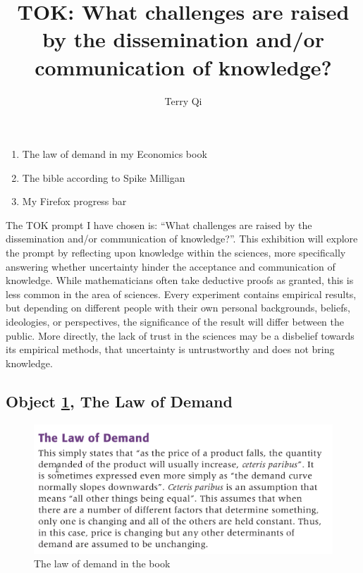 \documentclass[a4paper,12pt]{article}
\title{TOK: What challenges are raised by the dissemination and/or communication of knowledge?}
\author{Terry Qi}
\begin{document}
\maketitle
\begin{enumerate}
 \item The law of demand in my Economics book
 \item The bible according to Spike Milligan
 \item My Firefox progress bar
\end{enumerate}

\newpage



The TOK prompt I have chosen is: ``What challenges are raised by the dissemination and/or communication of knowledge?''. This exhibition will explore the prompt by reflecting upon knowledge within the sciences, more specifically answering whether uncertainty hinder the acceptance and communication of knowledge. While mathematicians often take deductive proofs as granted, this is less common in the area of sciences. Every experiment contains empirical results, but depending on different people with their own personal backgrounds, beliefs, ideologies, or perspectives, the significance of the result will differ between the public. More directly, the lack of trust in the sciences may be a disbelief towards its empirical methods, that uncertainty is untrustworthy and does not bring knowledge.


\subsection*{Object \ref{fig:lod}, The Law of Demand}

\begin{figure}[h!]
 \centering
 \includegraphics[scale=0.3]{ecobook.png}
 \caption{The law of demand in the book}
 \label{fig:lod}
\end{figure}
\end{document}
